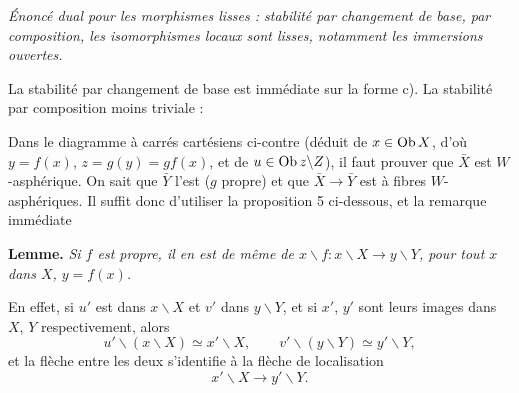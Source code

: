 \textit{Énoncé dual pour les morphismes lisses : stabilité par changement de base, par composition, les isomorphismes locaux sont lisses, notamment les immersions ouvertes.}

La stabilité par changement de base est immédiate sur la forme c). La stabilité par composition moins triviale :

\begin{center}
\end{center}

Dans le diagramme à carrés cartésiens ci-contre (déduit de $x \in \operatorname{Ob} X$, d'où $y = f(x)$, $z = g(y) = gf(x)$, et de $u \in \operatorname{Ob} z\backslash Z$), il faut prouver que $\bar{X}$ est $W$-asphérique. On sait que $\bar{Y}$ l'est ($g$ propre) et que $\bar{X} \longrightarrow \bar{Y}$ est à fibres $W$-asphériques. Il suffit donc d'utiliser la proposition 5 ci-dessous, et la remarque immédiate %

\textbf{Lemme.} \textit{Si $f$ est propre, il en est de même de $x\backslash f : x\backslash X \longrightarrow y\backslash Y$, pour tout $x$ dans $X$, $y = f(x)$.}

En effet, si $u'$ est dans $x\backslash X$ et $v'$ dans $y\backslash Y$, et si $x'$, $y'$ sont leurs images dans $X$, $Y$ respectivement, alors
\[
u'\backslash(x\backslash X)\simeq x'\backslash X,\qquad v'\backslash(y\backslash Y)\simeq y'\backslash Y,
\]
et la flèche entre les deux s'identifie à la flèche de localisation
\[
x'\backslash X\longrightarrow y'\backslash Y.
\]

